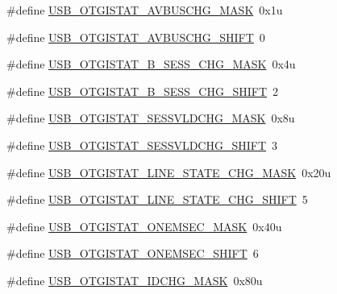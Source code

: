 \begin{DoxyCompactItemize}
\item 
\#define \hyperlink{group___u_s_b___register___masks_ga4aed6ee50bdd46063aa551dfb6e91d80}{U\+S\+B\+\_\+\+O\+T\+G\+I\+S\+T\+A\+T\+\_\+\+A\+V\+B\+U\+S\+C\+H\+G\+\_\+\+M\+A\+SK}~0x1u
\item 
\#define \hyperlink{group___u_s_b___register___masks_ga0b762b08ffd3b747e2d0ad17b5f1641a}{U\+S\+B\+\_\+\+O\+T\+G\+I\+S\+T\+A\+T\+\_\+\+A\+V\+B\+U\+S\+C\+H\+G\+\_\+\+S\+H\+I\+FT}~0
\item 
\#define \hyperlink{group___u_s_b___register___masks_gafa204dddd4f034a5085b4599642689d7}{U\+S\+B\+\_\+\+O\+T\+G\+I\+S\+T\+A\+T\+\_\+\+B\+\_\+\+S\+E\+S\+S\+\_\+\+C\+H\+G\+\_\+\+M\+A\+SK}~0x4u
\item 
\#define \hyperlink{group___u_s_b___register___masks_gad18c5869e529e7edbe3251ee5e3ff33f}{U\+S\+B\+\_\+\+O\+T\+G\+I\+S\+T\+A\+T\+\_\+\+B\+\_\+\+S\+E\+S\+S\+\_\+\+C\+H\+G\+\_\+\+S\+H\+I\+FT}~2
\item 
\#define \hyperlink{group___u_s_b___register___masks_ga859962123dc28f346bafc99263efb811}{U\+S\+B\+\_\+\+O\+T\+G\+I\+S\+T\+A\+T\+\_\+\+S\+E\+S\+S\+V\+L\+D\+C\+H\+G\+\_\+\+M\+A\+SK}~0x8u
\item 
\#define \hyperlink{group___u_s_b___register___masks_gabcccd593607e1118c8283f20c69d7512}{U\+S\+B\+\_\+\+O\+T\+G\+I\+S\+T\+A\+T\+\_\+\+S\+E\+S\+S\+V\+L\+D\+C\+H\+G\+\_\+\+S\+H\+I\+FT}~3
\item 
\#define \hyperlink{group___u_s_b___register___masks_ga596dfbf3a2a0a6e6dcb1885ef11b4f8f}{U\+S\+B\+\_\+\+O\+T\+G\+I\+S\+T\+A\+T\+\_\+\+L\+I\+N\+E\+\_\+\+S\+T\+A\+T\+E\+\_\+\+C\+H\+G\+\_\+\+M\+A\+SK}~0x20u
\item 
\#define \hyperlink{group___u_s_b___register___masks_ga7cb2076a9bf32a49fdbc7efcfc5fb8bb}{U\+S\+B\+\_\+\+O\+T\+G\+I\+S\+T\+A\+T\+\_\+\+L\+I\+N\+E\+\_\+\+S\+T\+A\+T\+E\+\_\+\+C\+H\+G\+\_\+\+S\+H\+I\+FT}~5
\item 
\#define \hyperlink{group___u_s_b___register___masks_gaa59b13f2f60173eaf2844dd089a6b31a}{U\+S\+B\+\_\+\+O\+T\+G\+I\+S\+T\+A\+T\+\_\+\+O\+N\+E\+M\+S\+E\+C\+\_\+\+M\+A\+SK}~0x40u
\item 
\#define \hyperlink{group___u_s_b___register___masks_ga561173eac45ee89d7447416da7747ec2}{U\+S\+B\+\_\+\+O\+T\+G\+I\+S\+T\+A\+T\+\_\+\+O\+N\+E\+M\+S\+E\+C\+\_\+\+S\+H\+I\+FT}~6
\item 
\#define \hyperlink{group___u_s_b___register___masks_ga853101783769b0e8f1c68dc63ed5dbbc}{U\+S\+B\+\_\+\+O\+T\+G\+I\+S\+T\+A\+T\+\_\+\+I\+D\+C\+H\+G\+\_\+\+M\+A\+SK}~0x80u
\item 

\end{DoxyCompactItemize}
